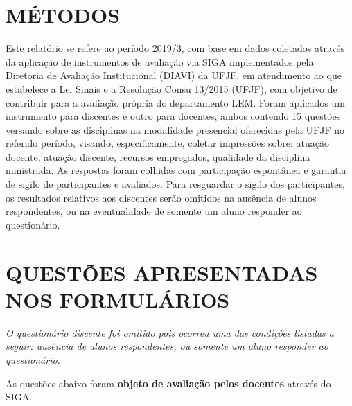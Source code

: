 \documentclass[a4paper,10pt]{article}
\begin{document}
\section{MÉTODOS}
Este relatório se refere ao período 2019/3, com base em dados     coletados através da aplicação de instrumentos de avaliação via SIGA     implementados pela Diretoria de Avaliação Institucional (DIAVI) da UFJF, em atendimento     ao que estabelece a Lei Sinais e a Resolução Consu 13/2015 (UFJF),     com objetivo de contribuir para a avaliação própria do departamento LEM.    Foram aplicados um instrumento para discentes e outro para docentes, ambos contendo     15 questões versando sobre as disciplinas na modalidade presencial oferecidas pela UFJF no     referido período, visando, especificamente, coletar impressões sobre: atuação docente, atuação discente,     recursos empregados, qualidade da disciplina ministrada.     As respostas foram colhidas      com participação espontânea e garantia de    sigilo de participantes e avaliados. Para resguardar o sigilo dos participantes, os resultados relativos aos discentes serão omitidos na ausência de alunos respondentes, ou na eventualidade de somente um aluno responder ao questionário.
\section{QUESTÕES APRESENTADAS NOS FORMULÁRIOS}
{ \it O questionário discente foi omitido pois ocorreu uma das condições listadas a seguir: ausência de alunos respondentes, ou somente um aluno responder ao questionário.}

As questões abaixo foram {\bf objeto de avaliação pelos docentes} através do SIGA.
\end{document}
